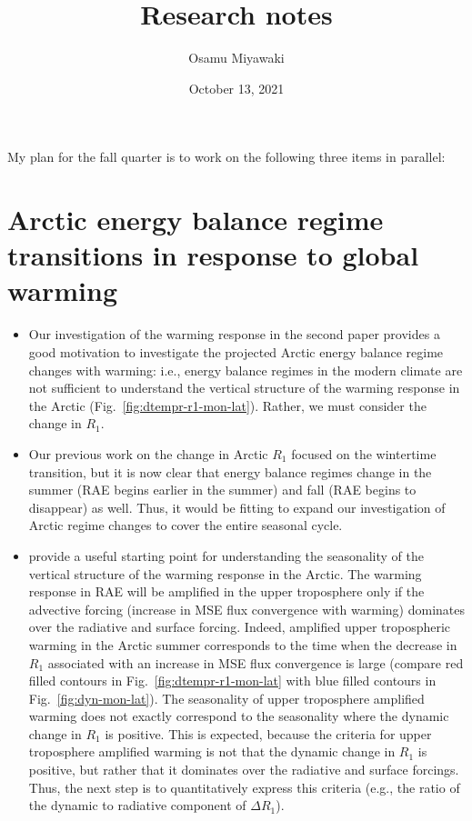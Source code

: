 \documentclass{article}
\title{Research notes}
\date{October 13, 2021}
\author{Osamu Miyawaki}
\begin{document}
\maketitle

My plan for the fall quarter is to work on the following three items in parallel:

\section*{Arctic energy balance regime transitions in response to global warming}
\begin{itemize}
    \item Our investigation of the warming response in the second paper provides a good motivation to investigate the projected Arctic energy balance regime changes with warming: i.e., energy balance regimes in the modern climate are not sufficient to understand the vertical structure of the warming response in the Arctic (Fig.~\ref{fig:dtempr-r1-mon-lat}). Rather, we must consider the change in $R_1$.
    \item Our previous work on the change in Arctic $R_1$ focused on the wintertime transition, but it is now clear that energy balance regimes change in the summer (RAE begins earlier in the summer) and fall (RAE begins to disappear) as well. Thus, it would be fitting to expand our investigation of Arctic regime changes to cover the entire seasonal cycle.
    \item \cite{payne2015} provide a useful starting point for understanding the seasonality of the vertical structure of the warming response in the Arctic. The warming response in RAE will be amplified in the upper troposphere only if the advective forcing (increase in MSE flux convergence with warming) dominates over the radiative and surface forcing. Indeed, amplified upper tropospheric warming in the Arctic summer corresponds to the time when the decrease in $R_1$ associated with an increase in MSE flux convergence is large (compare red filled contours in Fig.~\ref{fig:dtempr-r1-mon-lat} with blue filled contours in Fig.~\ref{fig:dyn-mon-lat}). The seasonality of upper troposphere amplified warming does not exactly correspond to the seasonality where the dynamic change in $R_1$ is positive. This is expected, because the criteria for upper troposphere amplified warming is not that the dynamic change in $R_1$ is positive, but rather that it dominates over the radiative and surface forcings. Thus, the next step is to quantitatively express this criteria (e.g., the ratio of the dynamic to radiative component of $\Delta R_1$).
\end{itemize}
\end{document}
